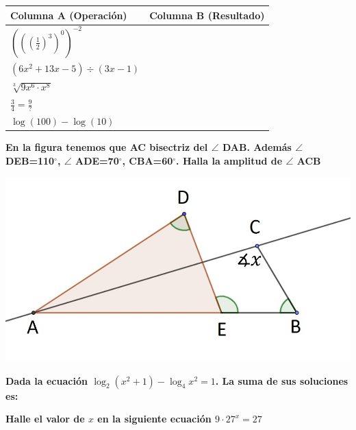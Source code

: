 \documentclass[11pt, addpoints, answers]{exam}
\begin{document}
\begin{questions}
		
		\begin{tabularx}{\textwidth}{|>{\RaggedRight\arraybackslash}X|X|}
			\hline
			\textbf{Columna A (Operación)} & \textbf{Columna B (Resultado)} \\
			\hline
			$\left(\left(\left(\frac{1}{2}\right)^3\right)^0\right)^{-2}$ & \\
			\hline
			$(6x^2+13x-5) \div (3x-1)$ & \\
			\hline
			$\sqrt[3]{9x^6 \cdot x^8}$ & \\
			\hline
			$\frac{3}{4} = \frac{9}{?}$ & \\
			\hline
			$\log(100) - \log(10)$ & \\
			\hline
		\end{tabularx}
		
		\vspace{0,5cm}
		
		
	\question[1] \textbf{En la figura tenemos que AC bisectriz del $\angle$ DAB. Además $\angle$ DEB=110$^\circ$, $\angle$ ADE=70$^\circ$, CBA=60$^\circ$. %
		  Halla la amplitud de $\angle$ ACB}
\begin{center}
		\includegraphics[width=0.7\linewidth]{fig1}
\end{center}

		  
\question[1]\textbf{Dada la ecuación $\log_2{(x^{2}+1)}-\log_4{x^{2}}=1$. La suma de sus soluciones es:}

\begin{oneparcheckboxes}
	
\end{oneparcheckboxes}
\question[1]\textbf{Halle el valor de $x$ en la siguiente ecuación $9\cdot27^{x}=27$}


\begin{oneparcheckboxes}
	

\end{oneparcheckboxes}
\end{questions}
\end{document}
